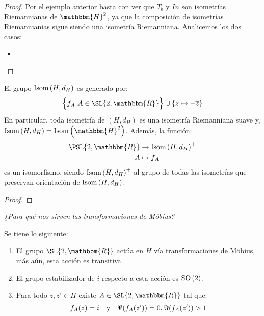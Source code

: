 \documentclass[12pt]{report}
\theoremstyle{largebreak}
\newcommand{\bbm}[1]{\ensuremath{\mathbbm{#1}}}
\newcommand{\Isom}[1]{\ensuremath{\textup{Isom}\left(#1\right)}}
\newcommand{\SO}[1]{\ensuremath{\textup{SO}\left(#1\right)}}
\begin{document}
    \begin{proof}
        Por el ejemplo anterior basta con ver que $T_b$ y $In$ son isometrías Riemannianas de $\bbm{H}^2$, ya que la composición de isometrías Riemannianias sigue siendo una isometría Riemanniana. Analicemos los dos casos:
        \begin{itemize}
            \item 
        \end{itemize}
    \end{proof}

    \begin{theor}
        El grupo $\Isom{H,d_H}$ es generado por:
        \begin{equation*}
            \left\{f_A\Big|A\in\SL{2,\bbm{R}} \right\}\cup\left\{z\mapsto-\overline{z} \right\}
        \end{equation*}
        En particular, toda isometría de $(H,d_H)$ es una isometría Riemanniana suave y, $\Isom{H,d_H}=\Isom{\bbm{H}^2}$. Además, la función:
        \begin{equation*}
            \begin{split}
                \PSL{2,\bbm{R}}&\rightarrow\Isom{H,d_H}^+\\
                A&\mapsto f_A\\
            \end{split}
        \end{equation*}
        es un isomorfismo, siendo $\Isom{H,d_H}^+$ al grupo de todas las isometrías que preservan orientación de $\Isom{H,d_H}$.
    \end{theor}

    \begin{proof}
        
    \end{proof}

    \begin{center}
        \textit{¿Para qué nos sirven las transformaciones de Möbius?}
    \end{center}

    \begin{propo}[\textbf{Acción de $\SL{2,\bbm{R}}$ en $H$}]
        \label{accionSL2RenH}
        Se tiene lo siguiente:
        \begin{enumerate}[label = \textit{(\arabic*)}]
            \item El grupo $\SL{2,\bbm{R}}$ actúa en $H$ vía transformaciones de Möbius, más aún, esta acción es transitiva.
            \item El grupo estabilizador de $i$ respecto a esta acción es $\SO{2}$.
            \item Para todo $z,z'\in H$ existe $A\in\SL{2,\bbm{R}}$ tal que:
            \begin{equation*}
                f_A(z)=i\quad\textup{y}\quad\Re(f_A(z'))=0, \Im(f_A(z'))>1
            \end{equation*}
        \end{enumerate}
    \end{propo}
\end{document}
